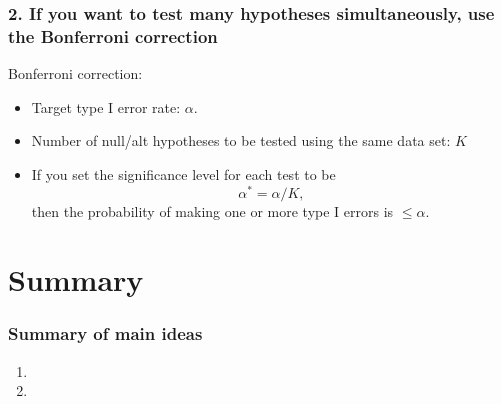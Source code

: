 \documentclass[slidestop,compress,mathserif,12pt,t,professionalfonts,xcolor=table]{beamer}
\begin{document}

\begin{frame}
  \frametitle{2. If you want to test many hypotheses simultaneously, use the Bonferroni correction}

\vfill

Bonferroni correction: 
\begin{itemize}
\item Target type I error rate: $\alpha$.

\item Number of null/alt hypotheses to be tested using the same data set: $K$

\item If you set the significance level for each test to be
\[
\alpha^* = \alpha / K,
\]
then the probability of making one or more type I errors is $ \leq \alpha$.

\end{itemize}

\vfill

\end{frame}


\begin{frame}
  \frametitle{}

\vfill


\vfill

\end{frame}


\section{Summary}


\begin{frame}
\frametitle{Summary of main ideas}

\vfill

\begin{enumerate}

\item {}

\item {}

\end{enumerate}

\vfill

\end{frame}

\end{document}
